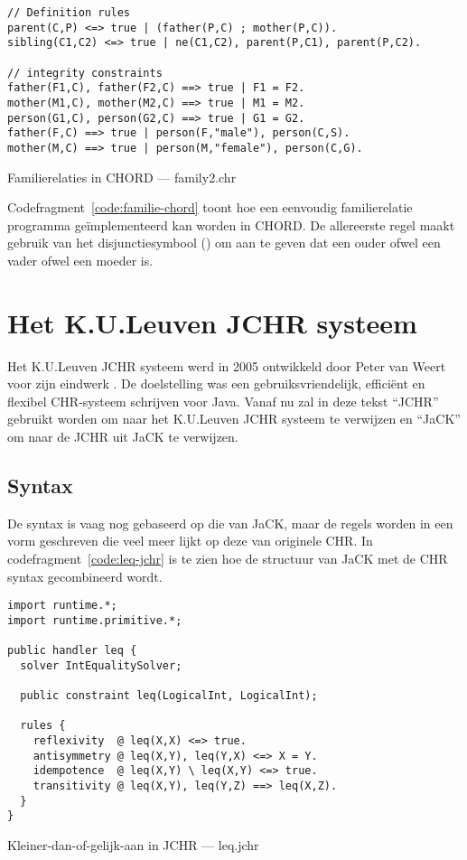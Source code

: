 \begin{exCode}[bhp]
\begin{Verbatim}[frame=single]
// Definition rules
parent(C,P) <=> true | (father(P,C) ; mother(P,C)).
sibling(C1,C2) <=> true | ne(C1,C2), parent(P,C1), parent(P,C2).

// integrity constraints
father(F1,C), father(F2,C) ==> true | F1 = F2.
mother(M1,C), mother(M2,C) ==> true | M1 = M2.
person(G1,C), person(G2,C) ==> true | G1 = G2.
father(F,C) ==> true | person(F,"male"), person(C,S).
mother(M,C) ==> true | person(M,"female"), person(C,G).
\end{Verbatim}
\caption{Familierelaties in CHORD --- family2.chr}
\label{code:familie-chord}
\end{exCode}
Codefragment~\ref{code:familie-chord} toont hoe een eenvoudig familierelatie programma ge\"implementeerd kan worden in CHORD. De allereerste regel maakt gebruik van het disjunctiesymbool (\code{;}) om aan te geven dat een ouder ofwel een vader ofwel een moeder is.

\section{Het K.U.Leuven JCHR systeem} \label{sec:kuljchr}

Het K.U.Leuven JCHR systeem werd in 2005 ontwikkeld door Peter van Weert voor zijn eindwerk \cite{jchr_thesis}. De doelstelling was een gebruiksvriendelijk, effici\"ent en flexibel CHR-systeem schrijven voor Java. Vanaf nu zal in deze tekst ``JCHR'' gebruikt worden om naar het K.U.Leuven JCHR systeem te verwijzen en ``JaCK'' om naar de JCHR uit JaCK te verwijzen.

\subsection{Syntax}

De syntax is vaag nog gebaseerd op die van JaCK, maar de regels worden in een vorm geschreven die veel meer lijkt op deze van originele CHR. In codefragment~\ref{code:leq-jchr} is te zien hoe de structuur van JaCK met de CHR syntax gecombineerd wordt.
\begin{exCode}
\begin{Verbatim}[frame=single]
import runtime.*;
import runtime.primitive.*;

public handler leq {
  solver IntEqualitySolver;

  public constraint leq(LogicalInt, LogicalInt);

  rules {
    reflexivity  @ leq(X,X) <=> true.
    antisymmetry @ leq(X,Y), leq(Y,X) <=> X = Y.
    idempotence  @ leq(X,Y) \ leq(X,Y) <=> true.
    transitivity @ leq(X,Y), leq(Y,Z) ==> leq(X,Z).
  }
}

\end{Verbatim}
\caption{Kleiner-dan-of-gelijk-aan in JCHR --- leq.jchr}
\label{code:leq-jchr}
\end{exCode}

